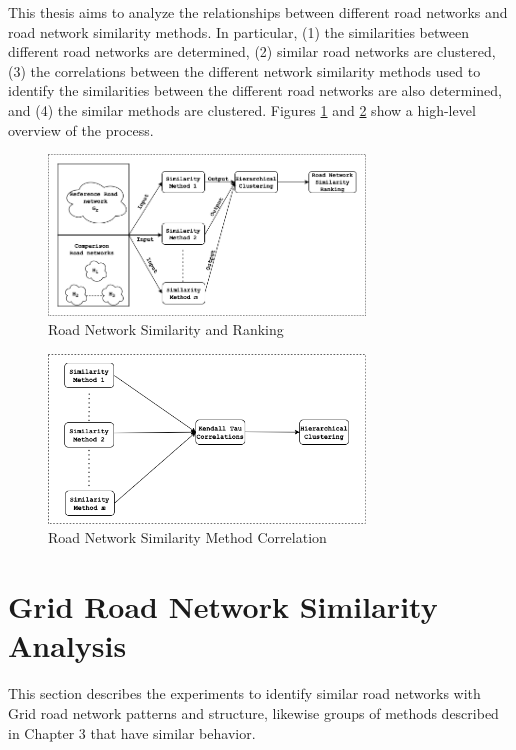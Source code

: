 
This thesis aims to analyze the relationships between different road networks and road network similarity methods. In particular,  (1) the similarities between different road networks are determined, (2) similar road networks are clustered, (3) the correlations between the different network similarity methods used to identify the similarities between the different road networks are also determined, and (4) the similar methods are clustered. Figures \ref{fig:Road Network Similarity and Ranking} and \ref{fig:Road Network Similarity Method Correlation} show a high-level overview of the process. 

\begin{figure}[h]
\centering
\includegraphics[width=0.75\textwidth,center]{picture/network_ranking.png}
\caption[Road Network Similarity and Ranking]{Road Network Similarity and Ranking}
\label{fig:Road Network Similarity and Ranking}
\end{figure}

\begin{figure}[!ht]
\centering
\includegraphics[width=0.75\textwidth,center]{picture/ranking.png}
\caption[Road Network Similarity Method Correlation]{Road Network Similarity Method Correlation}
\label{fig:Road Network Similarity Method Correlation}
\end{figure}


\section{Grid Road Network Similarity Analysis}
This section describes the experiments to identify similar road networks with Grid road network patterns and structure, likewise groups of methods described in Chapter 3 that have similar behavior.

